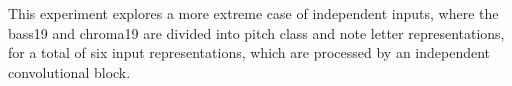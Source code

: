 
This experiment explores a more extreme case of independent
inputs, where the \gls{bass19} and \gls{chroma19} are
divided into pitch class and note letter representations,
for a total of six input representations, which are
processed by an independent convolutional block.

